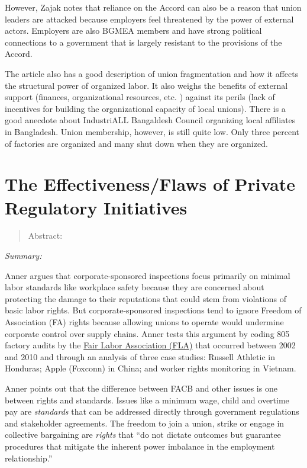 \documentclass[
  12pt,
]{article}
\begin{document}
However, Zajak notes that reliance on the Accord can also be a reason
that union leaders are attacked because employers feel threatened by the
power of external actors. Employers are also BGMEA members and have
strong political connections to a government that is largely resistant
to the provisions of the Accord.

The article also has a good description of union fragmentation and how
it affects the structural power of organized labor. It also weighs the
benefits of external support (finances, organizational resources, etc. )
against its perils (lack of incentives for building the organizational
capacity of local unions). There is a good anecdote about IndustriALL
Bangaldesh Council organizing local affiliates in Bangladesh. Union
membership, however, is still quite low. Only three percent of factories
are organized and many shut down when they are organized.

\hypertarget{the-effectivenessflaws-of-private-regulatory-initiatives}{%
\section{The Effectiveness/Flaws of Private Regulatory
Initiatives}\label{the-effectivenessflaws-of-private-regulatory-initiatives}}


\begin{quote}
Abstract: 

\end{quote}

\emph{Summary:}

Anner argues that corporate-sponsored inspections focus primarily on
minimal labor standards like workplace safety because they are concerned
about protecting the damage to their reputations that could stem from
violations of basic labor rights. But corporate-sponsored inspections
tend to ignore Freedom of Association (FA) rights because allowing
unions to operate would undermine corporate control over supply chains.
Anner tests this argument by coding 805 factory audits by the
\href{https://www.fairlabor.org/}{Fair Labor Association (FLA)} that
occurred between 2002 and 2010 and through an analysis of three case
studies: Russell Athletic in Honduras; Apple (Foxconn) in China; and
worker rights monitoring in Vietnam.

Anner points out that the difference between FACB and other issues is
one between rights and standards. Issues like a minimum wage, child and
overtime pay are \emph{standards} that can be addressed directly through
government regulations and stakeholder agreements. The freedom to join a
union, strike or engage in collective bargaining are \emph{rights} that
``do not dictate outcomes but guarantee procedures that mitigate the
inherent power imbalance in the employment relationship.''
\end{document}
